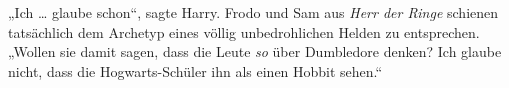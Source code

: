 „Ich … glaube schon“, sagte Harry. Frodo und Sam aus \emph{Herr der Ringe} schienen tatsächlich dem Archetyp eines völlig unbedrohlichen Helden zu entsprechen.
„Wollen sie damit sagen, dass die Leute \emph{so} über Dumbledore denken? Ich glaube nicht, dass die Hogwarts-Schüler ihn als einen Hobbit sehen.“


